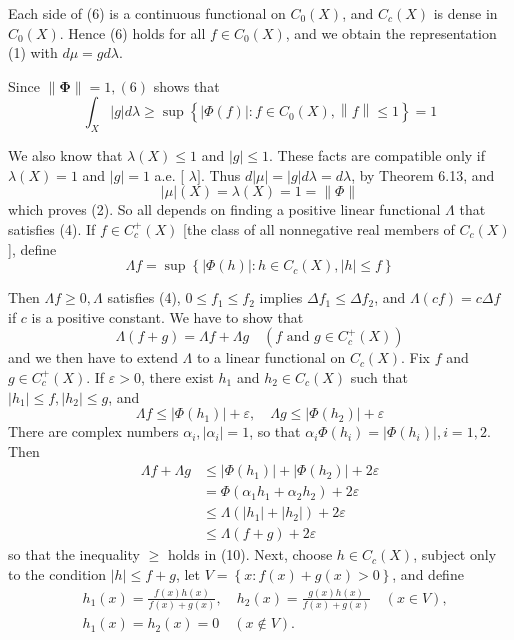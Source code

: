\documentclass[12pt, a4paper, oneside]{book}
\begin{document}
\begin{theorem}
    Each side of (6) is a continuous functional on $C_0(X)$, and $C_c(X)$ is dense in $C_0(X)$. Hence (6) holds for all $f \in C_0(X)$, and we obtain the representation (1) with $d \mu=g d \lambda$.

    Since $\|\boldsymbol{\Phi}\|=1,(6)$ shows that
    $$
        \int_X|g| d \lambda \geq \sup \left\{|\Phi(f)|: f \in C_0(X),\left\| f \right\| \leq 1\right\}=1
    $$

    We also know that $\lambda(X) \leq 1$ and $|g| \leq 1$. These facts are compatible only if $\lambda(X)=1$ and $|g|=1$ a.e. [ $\lambda]$. Thus $d|\mu|=|g| d \lambda=d \lambda$, by Theorem 6.13, and
        $$
            |\mu|(X)=\lambda(X)=1=\|\Phi\|
        $$
        which proves (2).
        So all depends on finding a positive linear functional $\Lambda$ that satisfies (4). If $f \in C_c^{+}(X)$ [the class of all nonnegative real members of $C_c(X)$ ], define
        $$
            \Lambda f=\sup \left\{|\Phi(h)|: h \in C_c(X),|h| \leq f\right\}
        $$

        Then $\Lambda f \geq 0, \Lambda$ satisfies (4), $0 \leq f_1 \leq f_2$ implies $\Delta f_1 \leq \Delta f_2$, and $\Lambda(c f)=c \Delta f$ if $c$ is a positive constant. We have to show that
        $$
            \Lambda(f+g)=\Lambda f+\Lambda g \quad\left(f \text { and } g \in C_c^{+}(X)\right)
        $$
        and we then have to extend $\Lambda$ to a linear functional on $C_c(X)$.
        Fix $f$ and $g \in C_c^{+}(X)$. If $\varepsilon>0$, there exist $h_1$ and $h_2 \in C_c(X)$ such that $\left|h_1\right| \leq f,\left|h_2\right| \leq g$, and
        $$
            \Lambda f \leq\left|\Phi\left(h_1\right)\right|+\varepsilon, \quad \Lambda g \leq\left|\Phi\left(h_2\right)\right|+\varepsilon
        $$
        There are complex numbers $\alpha_i,\left|\alpha_i\right|=1$, so that $\alpha_i \Phi\left(h_i\right)=\left|\Phi\left(h_i\right)\right|, i=1,2$. Then
        $$
            \begin{aligned}
                \Lambda f+\Lambda g & \leq\left|\Phi\left(h_1\right)\right|+\left|\Phi\left(h_2\right)\right|+2 \varepsilon \\
                                    & =\Phi\left(\alpha_1 h_1+\alpha_2 h_2\right)+2 \varepsilon                             \\
                                    & \leq \Lambda\left(\left|h_1\right|+\left|h_2\right|\right)+2 \varepsilon              \\
                                    & \leq \Lambda(f+g)+2 \varepsilon
            \end{aligned}
        $$
        so that the inequality $\geq$ holds in (10).
        Next, choose $h \in C_c(X)$, subject only to the condition $|h| \leq f+g$, let $V=\left\{x: f(x)+g(x)>0\right\}$, and define
        $$
            \begin{aligned}
                 & h_1(x)=\frac{f(x) h(x)}{f(x)+g(x)}, \quad h_2(x)=\frac{g(x) h(x)}{f(x)+g(x)} \quad(x \in V), \\
                 & h_1(x)=h_2(x)=0 \quad(x \notin V) .
            \end{aligned}
        $$


\end{theorem}
\end{document}
